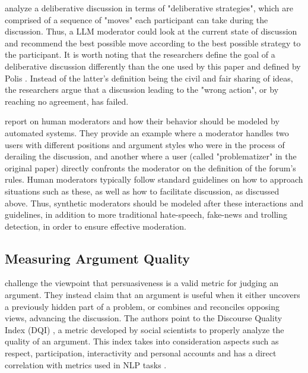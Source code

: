 \cite{al-khatib-etal-2018-modeling} analyze a deliberative discussion in terms of "deliberative strategies", which are comprised of a sequence of "moves" each participant can take during the discussion. Thus, a LLM moderator could look at the current state of discussion and recommend the best possible move according to the best possible strategy to the participant. It is worth noting that the researchers define the goal of a deliberative discussion differently than the one used by this paper and defined by Polis \cite{small-polis-llm}. Instead of the latter's definition being the civil and fair sharing of ideas, the researchers argue that a discussion leading to the "wrong action", or by reaching no agreement, has failed.

\cite{vecchi-2021-towards} report on human moderators and how their behavior should be modeled by automated systems. They provide an example where a moderator handles two users with different positions and argument styles who were in the process of derailing the discussion, and another where a user (called "problematizer" in the original paper) directly confronts the moderator on the definition of the forum's rules. Human moderators typically follow standard guidelines on how to approach situations such as these, as well as how to facilitate discussion, as discussed above. Thus, synthetic moderators should be modeled after these interactions and guidelines, in addition to more traditional hate-speech, fake-news and trolling detection, in order to ensure effective moderation. 


\subsection{Measuring Argument Quality}
\label{sec:related:measures}

\cite{vecchi-2021-towards} challenge the viewpoint that persuasiveness is a valid metric for judging an argument. They instead claim that an argument is useful when it either uncovers a previously hidden part of a problem, or combines and reconciles opposing views, advancing the discussion. The authors point to the Discourse Quality Index (DQI) \cite{Steiner2005-STEDPI-8, stab-gurevych-2017-parsing}, a metric developed by social scientists to properly analyze the quality of an argument. This index takes into consideration aspects such as respect, participation, interactivity and personal accounts and has a direct correlation with metrics used in NLP tasks \cite{wachsmuth-etal-2017-computational}. 


